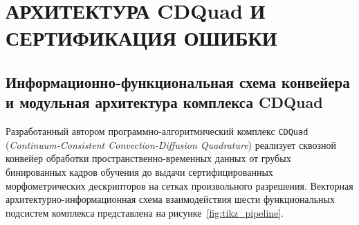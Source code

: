 
\chapter{АРХИТЕКТУРА CDQuad И СЕРТИФИКАЦИЯ ОШИБКИ}

\section{Информационно-функциональная схема конвейера и модульная архитектура комплекса CDQuad}

Разработанный автором программно-алгоритмический комплекс \texttt{CDQuad} (\emph{Continuum-Consistent Convection-Diffusion Quadrature}) реализует сквозной конвейер обработки пространственно-временных данных от грубых бинированных кадров обучения до выдачи сертифицированных морфометрических дескрипторов на сетках произвольного разрешения. Векторная архитектурно-информационная схема взаимодействия шести функциональных подсистем комплекса представлена на рисунке~\ref{fig:tikz_pipeline}.


